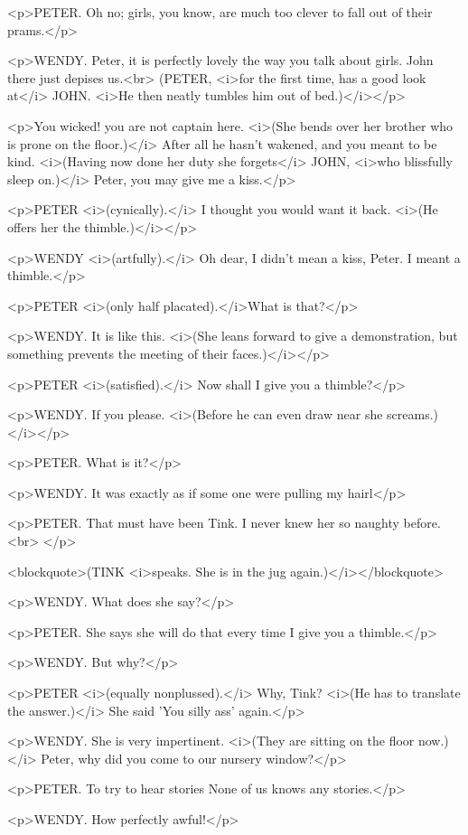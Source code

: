 <p>PETER. Oh no; girls, you know, are much too clever to fall out of
their prams.</p>

<p>WENDY. Peter, it is perfectly lovely the way you talk about girls.
John there just depises us.<br>
(PETER, <i>for the first time, has a good look at</i> JOHN. <i>He
then neatly tumbles him out of bed.)</i></p>

<p>You wicked! you are not captain here. <i>(She bends over her
brother who is prone on the floor.)</i> After all he hasn't wakened,
and you meant to be kind. <i>(Having now done her duty she
forgets</i> JOHN, <i>who blissfully sleep on.)</i> Peter, you may
give me a kiss.</p>

<p>PETER <i>(cynically).</i> I thought you would want it back. <i>(He
offers her the thimble.)</i></p>

<p>WENDY <i>(artfully).</i> Oh dear, I didn't mean a kiss, Peter. I
meant a thimble.</p>

<p>PETER <i>(only half placated).</i>What is that?</p>

<p>WENDY. It is like this. <i>(She leans forward to give a
demonstration, but something prevents the meeting of their
faces.)</i></p>

<p>PETER <i>(satisfied).</i> Now shall I give you a thimble?</p>

<p>WENDY. If you please. <i>(Before he can even draw near she
screams.)</i></p>

<p>PETER. What is it?</p>

<p>WENDY. It was exactly as if some one were pulling my hairl</p>

<p>PETER. That must have been Tink. I never knew her so naughty
before.<br>
</p>

<blockquote>(TINK <i>speaks. She is in the jug
again.)</i></blockquote>

<p>WENDY. What does she say?</p>

<p>PETER. She says she will do that every time I give you a
thimble.</p>

<p>WENDY. But why?</p>

<p>PETER <i>(equally nonplussed).</i> Why, Tink? <i>(He has to
translate the answer.)</i> She said 'You silly ass' again.</p>

<p>WENDY. She is very impertinent. <i>(They are sitting on the floor
now.)</i> Peter, why did you come to our nursery window?</p>

<p>PETER. To try to hear stories None of us knows any stories.</p>

<p>WENDY. How perfectly awful!</p>

